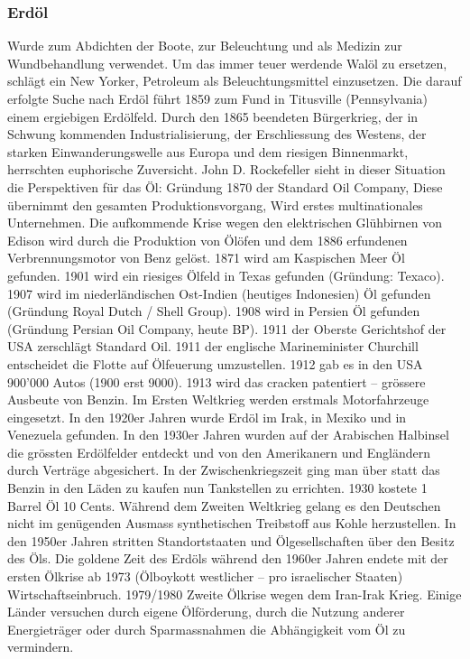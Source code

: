\documentclass[10pt, openright=true]{scrartcl}
\begin{document}
\subsubsection{Erdöl}
Wurde zum Abdichten der Boote, zur Beleuchtung und als Medizin zur Wundbehandlung verwendet. Um das immer teuer werdende Walöl zu ersetzen, schlägt ein New Yorker, Petroleum als Beleuchtungsmittel einzusetzen. Die darauf erfolgte Suche nach Erdöl führt 1859 zum Fund in Titusville (Pennsylvania) einem ergiebigen Erdölfeld. Durch den 1865 beendeten Bürgerkrieg, der in Schwung kommenden Industrialisierung, der Erschliessung des Westens, der starken Einwanderungswelle aus Europa und dem riesigen Binnenmarkt, herrschten euphorische Zuversicht. John D. Rockefeller sieht in dieser Situation die Perspektiven für das Öl: Gründung 1870 der Standard Oil Company, Diese übernimmt den gesamten Produktionsvorgang, Wird erstes multinationales Unternehmen. Die aufkommende Krise wegen den elektrischen Glühbirnen von Edison wird durch die Produktion von Ölöfen und dem 1886 erfundenen Verbrennungsmotor von Benz gelöst. 1871 wird am Kaspischen Meer Öl gefunden. 1901 wird ein riesiges Ölfeld in Texas gefunden (Gründung: Texaco). 1907 wird im niederländischen Ost-Indien (heutiges Indonesien) Öl gefunden (Gründung Royal Dutch / Shell Group). 1908 wird in Persien Öl gefunden (Gründung Persian Oil Company, heute BP). 1911 der Oberste Gerichtshof der USA zerschlägt Standard Oil. 1911 der englische Marineminister Churchill entscheidet die Flotte auf Ölfeuerung umzustellen. 1912 gab es in den USA 900’000 Autos (1900 erst 9000). 1913 wird das cracken patentiert – grössere Ausbeute von Benzin. Im Ersten Weltkrieg werden erstmals Motorfahrzeuge eingesetzt. In den 1920er Jahren wurde Erdöl im Irak, in Mexiko und in Venezuela gefunden. In den 1930er Jahren wurden auf der Arabischen Halbinsel die grössten Erdölfelder entdeckt und von den Amerikanern und Engländern durch Verträge abgesichert. In der Zwischenkriegszeit ging man über statt das Benzin in den Läden zu kaufen nun Tankstellen zu errichten. 1930 kostete 1 Barrel Öl 10 Cents. Während dem Zweiten Weltkrieg gelang es den Deutschen nicht im genügenden Ausmass synthetischen Treibstoff aus Kohle herzustellen. In den 1950er Jahren stritten Standortstaaten und Ölgesellschaften über den Besitz des Öls. Die goldene Zeit des Erdöls während den 1960er Jahren endete mit der ersten Ölkrise ab 1973 (Ölboykott westlicher – pro israelischer Staaten) Wirtschaftseinbruch. 1979/1980 Zweite Ölkrise wegen dem Iran-Irak Krieg. Einige Länder versuchen durch eigene Ölförderung, durch die Nutzung anderer Energieträger oder durch Sparmassnahmen die Abhängigkeit vom Öl zu vermindern.
\end{document}

